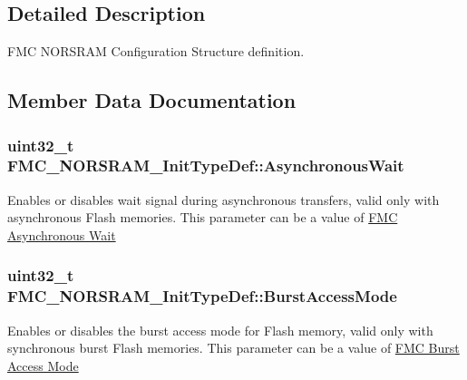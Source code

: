 \subsection{Detailed Description}
F\+MC N\+O\+R\+S\+R\+AM Configuration Structure definition. 

\subsection{Member Data Documentation}
\subsubsection[{\texorpdfstring{Asynchronous\+Wait}{AsynchronousWait}}]{\setlength{\rightskip}{0pt plus 5cm}uint32\+\_\+t F\+M\+C\+\_\+\+N\+O\+R\+S\+R\+A\+M\+\_\+\+Init\+Type\+Def\+::\+Asynchronous\+Wait}\hypertarget{struct_f_m_c___n_o_r_s_r_a_m___init_type_def_a6f7202e07e74e5661035e39d6835fc01}{}\label{struct_f_m_c___n_o_r_s_r_a_m___init_type_def_a6f7202e07e74e5661035e39d6835fc01}
Enables or disables wait signal during asynchronous transfers, valid only with asynchronous Flash memories. This parameter can be a value of \hyperlink{group___f_m_c___asynchronous_wait}{F\+MC Asynchronous Wait} 
\subsubsection[{\texorpdfstring{Burst\+Access\+Mode}{BurstAccessMode}}]{\setlength{\rightskip}{0pt plus 5cm}uint32\+\_\+t F\+M\+C\+\_\+\+N\+O\+R\+S\+R\+A\+M\+\_\+\+Init\+Type\+Def\+::\+Burst\+Access\+Mode}\hypertarget{struct_f_m_c___n_o_r_s_r_a_m___init_type_def_a4ae26963827925c3fa05a4acac6bf7de}{}\label{struct_f_m_c___n_o_r_s_r_a_m___init_type_def_a4ae26963827925c3fa05a4acac6bf7de}
Enables or disables the burst access mode for Flash memory, valid only with synchronous burst Flash memories. This parameter can be a value of \hyperlink{group___f_m_c___burst___access___mode}{F\+MC Burst Access Mode} 
